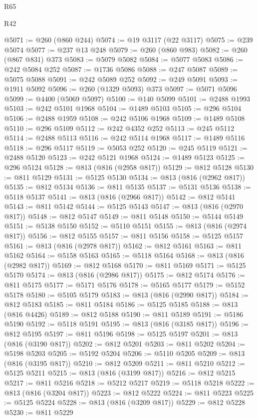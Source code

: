 \begin{lexlean}{R65}
\begin{lexlean}{R42}
\begin{coremodule}
{{{{{{{{{{{{{{{{{{{{{{{{{{{{{{{{{{{{{{{{{{{{{{{{{{{{{{{{{{{{{{{{{{{{{{{{{{{{{{{{{{{{{{{{{{{{{{{{{{{{{{{{{{{{{{{{{{{{{{{{{{{{{{{{{{{{{{{{{{{{{{{{{{{{{{{{{{{{{{{{{{{{{{{{{{{{{{{{{{{{{{{{@5071 := @260 (@860 @244)
@5074 := @19 @3117 (@22 @3117)
@5075 := @239 @5074
@5077 := @237 @13 @248
@5079 := @260 (@860 @983)
@5082 := @260 (@867 @831) @373
@5083 := @5079 @5082
@5084 := @5077 @5083
@5086 := @242 @5084 @252
@5087 := @1736 @5086
@5088 := @247 @5087
@5089 := @5075 @5088
@5091 := @242 @5089 @252
@5092 := @249 @5091
@5093 := @1911 @5092
@5096 := @260 (@1329 @5093) @373
@5097 := @5071 @5096
@5099 := @4400 (@5069 @5097)
@5100 := @140 @5099
@5101 := @2488 @1993
@5103 := @242 @5101 @1968
@5104 := @1489 @5103
@5105 := @296 @5104
@5106 := @2488 @1959
@5108 := @242 @5106 @1968
@5109 := @1489 @5108
@5110 := @296 @5109
@5112 := @242 @4352 @252
@5113 := @245 @5112
@5114 := @2488 @5113
@5116 := @242 @5114 @1968
@5117 := @1489 @5116
@5118 := @296 @5117
@5119 := @5053 @252
@5120 := @245 @5119
@5121 := @2488 @5120
@5123 := @242 @5121 @1968
@5124 := @1489 @5123
@5125 := @296 @5124
@5128 := @813 (@816 (@2958 @817))
@5129 := @812 @5128
@5130 := @811 @5129
@5131 := @5125 @5130
@5134 := @813 (@816 (@2962 @817))
@5135 := @812 @5134
@5136 := @811 @5135
@5137 := @5131 @5136
@5138 := @5118 @5137
@5141 := @813 (@816 (@2966 @817))
@5142 := @812 @5141
@5143 := @811 @5142
@5144 := @5125 @5143
@5147 := @813 (@816 (@2970 @817))
@5148 := @812 @5147
@5149 := @811 @5148
@5150 := @5144 @5149
@5151 := @5138 @5150
@5152 := @5110 @5151
@5155 := @813 (@816 (@2974 @817))
@5156 := @812 @5155
@5157 := @811 @5156
@5158 := @5125 @5157
@5161 := @813 (@816 (@2978 @817))
@5162 := @812 @5161
@5163 := @811 @5162
@5164 := @5158 @5163
@5165 := @5118 @5164
@5168 := @813 (@816 (@2982 @817))
@5169 := @812 @5168
@5170 := @811 @5169
@5171 := @5125 @5170
@5174 := @813 (@816 (@2986 @817))
@5175 := @812 @5174
@5176 := @811 @5175
@5177 := @5171 @5176
@5178 := @5165 @5177
@5179 := @5152 @5178
@5180 := @5105 @5179
@5183 := @813 (@816 (@2990 @817))
@5184 := @812 @5183
@5185 := @811 @5184
@5186 := @5125 @5185
@5188 := @813 (@816 @4426)
@5189 := @812 @5188
@5190 := @811 @5189
@5191 := @5186 @5190
@5192 := @5118 @5191
@5195 := @813 (@816 (@3185 @817))
@5196 := @812 @5195
@5197 := @811 @5196
@5198 := @5125 @5197
@5201 := @813 (@816 (@3190 @817))
@5202 := @812 @5201
@5203 := @811 @5202
@5204 := @5198 @5203
@5205 := @5192 @5204
@5206 := @5110 @5205
@5209 := @813 (@816 (@3195 @817))
@5210 := @812 @5209
@5211 := @811 @5210
@5212 := @5125 @5211
@5215 := @813 (@816 (@3199 @817))
@5216 := @812 @5215
@5217 := @811 @5216
@5218 := @5212 @5217
@5219 := @5118 @5218
@5222 := @813 (@816 (@3204 @817))
@5223 := @812 @5222
@5224 := @811 @5223
@5225 := @5125 @5224
@5228 := @813 (@816 (@3209 @817))
@5229 := @812 @5228
@5230 := @811 @5229
}}}}}}}}}}}}}}}}}}}}}}}}}}}}}}}}}}}}}}}}}}}}}}}}}}}}}}}}}}}}}}}}}}}}}}}}}}}}}}}}}}}}}}}}}}}}}}}}}}}}}}}}}}}}}}}}}}}}}}}}}}}}}}}}}}}}}}}}}}}}}}}}}}}}}}}}}}}}}}}}}}}}}}}}}}}}}}}}}}}}}}}}
\end{coremodule}
\end{lexlean}
\end{lexlean}
